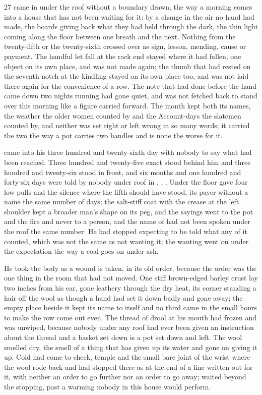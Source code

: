 
 27 came in under the roof without a boundary drawn, the way a morning comes into a house that has not been waiting for it: by a change in the air no hand had made, the boards giving back what they had held through the dark, the thin light coming along the floor between one breath and the next. Nothing from the twenty-fifth or the twenty-sixth crossed over as sign, lesson, mending, cause or payment. The handful let fall at the rack end stayed where it had fallen, one object on its own place, and was not made again; the thumb that had rested on the seventh notch at the kindling stayed on its own place too, and was not laid there again for the convenience of a row. The note that had done before the hand came down two nights running had gone quiet, and was not fetched back to stand over this morning like a figure carried forward. The month kept both its names, the weather the older women counted by and the Account-days the slatemen counted by, and neither was set right or left wrong in so many words; it carried the two the way a pot carries two handles and is none the worse for it.

 came into his three hundred and twenty-sixth day with nobody to say what had been reached. Three hundred and twenty-five exact stood behind him and three hundred and twenty-six stood in front, and six months and one hundred and forty-six days were told by nobody under  roof in , , . Under the floor  gave four low pulls and the silence where the fifth should have stood, its payer without a name the same number of days; the salt-stiff coat with the crease at the left shoulder kept a broader man's shape on its peg, and the sayings went to the pot and the fire and never to a person, and the name of  had not been spoken under the roof the same number. He had stopped expecting to be told what any of it counted, which was not the same as not wanting it; the wanting went on under the expectation the way a coal goes on under ash.

He took the body as a wound is taken, in its old order, because the order was the one thing in the room that had not moved. One stiff brown-edged barley crust lay two inches from his ear, gone leathery through the dry heat, its corner standing a hair off the wool as though a hand had set it down badly and gone away; the empty place beside it kept its name to itself and no third came in the small hours to make the row come out even. The thread of drool at his mouth had frozen and was unwiped, because nobody under any roof had ever been given an instruction about the thread and a basket set down is a pot set down and left. The wool smelled dry, the smell of a thing that has given up its water and gone on giving it up. Cold had come to cheek, temple and the small bare joint of the wrist where the wool rode back and had stopped there as at the end of a line written out for it, with neither an order to go further nor an order to go away;  waited beyond the stopping, past a warming nobody in this house would perform.

